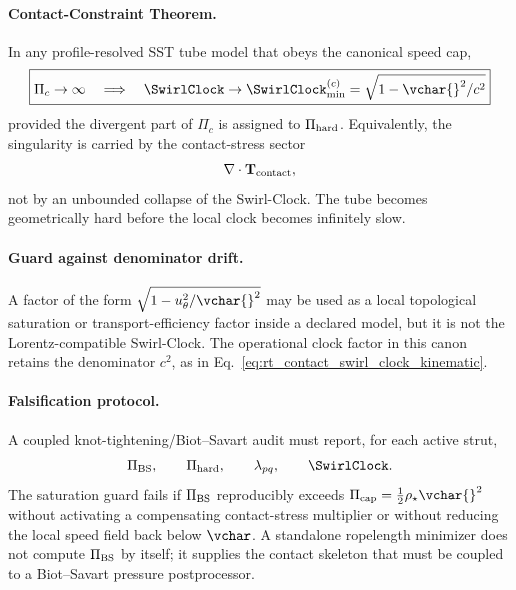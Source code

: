 \paragraph{Contact-Constraint Theorem.}
In any profile-resolved SST tube model that obeys the canonical speed cap,
\begin{equation}
    \boxed{
    \Pi_c\to\infty
    \quad\Longrightarrow\quad
    \SwirlClock
    \to
    \SwirlClock_{\min}^{(c)}
    =
    \sqrt{1-\vchar{}^2/c^2}
    }
    \label{eq:rt_contact_constraint_theorem}
\end{equation}
provided the divergent part of \(\Pi_c\) is assigned to \(\Pi_{\rm hard}\).
Equivalently, the singularity is carried by the contact-stress sector
\begin{equation}
    \nabla\cdot\mathbf T_{\rm contact},
    \label{eq:rt_contact_stress_divergence_guard}
\end{equation}
not by an unbounded collapse of the Swirl-Clock.  The tube becomes
geometrically hard before the local clock becomes infinitely slow.

\paragraph{Guard against denominator drift.}
A factor of the form \(\sqrt{1-u_\theta^2/\vchar{}^2}\) may be used as a
local topological saturation or transport-efficiency factor inside a declared
model, but it is not the Lorentz-compatible Swirl-Clock.  The operational
clock factor in this canon retains the denominator \(c^2\), as in
Eq.~\eqref{eq:rt_contact_swirl_clock_kinematic}.

\paragraph{Falsification protocol.}
A coupled knot-tightening/Biot--Savart audit must report, for each active strut,
\begin{equation}
    \Pi_{\rm BS},\qquad
    \Pi_{\rm hard},\qquad
    \lambda_{pq},\qquad
    \SwirlClock .
    \label{eq:rt_contact_saturation_audit_tuple}
\end{equation}
The saturation guard fails if \(\Pi_{\rm BS}\) reproducibly exceeds
\(\Pi_{\rm cap}=\tfrac12\rho_\star\vchar{}^2\) without activating a compensating
contact-stress multiplier or without reducing the local speed field back below
\(\vchar\).  A standalone ropelength minimizer does not compute
\(\Pi_{\rm BS}\) by itself; it supplies the contact skeleton that must be coupled
to a Biot--Savart pressure postprocessor.



